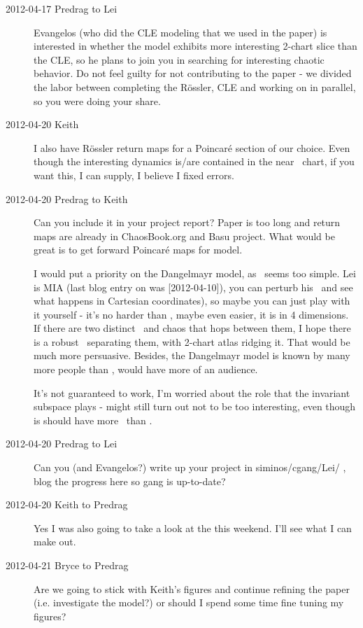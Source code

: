 \begin{description}
\item[2012-04-17 Predrag to Lei] Evangelos (who did the CLE modeling that
we used in the paper) is interested in whether the {\twoMode} model exhibits
more interesting 2-chart slice than the CLE, so he plans to join you in
searching for interesting chaotic behavior. Do not feel guilty for not
contributing to the paper - we divided the labor between completing the
R\"ossler, CLE and working on {\twoMode} in parallel, so you were doing your
share.


\item[2012-04-20 Keith] I also have R\"ossler return maps for a
Poincar\'e section of our choice.  Even though the interesting dynamics
is/are contained in the near \eqv\ chart, if you want this, I can
supply, I believe I fixed errors.

\item[2012-04-20 Predrag to Keith] Can you include it in your project report?
Paper is too long and return maps are already in ChaosBook.org and Basu project.
What would be great is to get forward Poincar\'e maps for {\twoMode} model.

I would put a priority on the Dangelmayr {\twoMode} model, as \cLe\ seems too
simple. Lei is MIA (last blog entry on {\twoMode} was [2012-04-10]), you can
perturb his \reqva\ and see what happens in Cartesian coordinates), so
maybe you can just play with it yourself - it's no harder than \cLe,
maybe even easier, it is in 4 dimensions. If there are two distinct
\reqva\ and chaos that hops between them, I hope there is a robust
\chartBord\ separating them, with 2-chart atlas ridging it. That would be
much more persuasive. Besides, the Dangelmayr {\twoMode} model is known by
many more people than \cLe, would have more of an audience.

It's not guaranteed to work, I'm worried about the role that the
invariant subspace plays - might still turn out not to be too
interesting, even though is should have more \reqva\ than \cLe.


\item[2012-04-20 Predrag to Lei] Can you (and Evangelos?) write up {\twoMode}
your project in siminos/cgang/Lei/ , blog the progress here so gang is
up-to-date?

\item[2012-04-20 Keith to Predrag]  Yes I was also going to take a look
at the {\twoMode} this weekend.  I'll see what I can make out.

\item[2012-04-21 Bryce to Predrag] Are we going to stick
with Keith's figures and continue refining the paper (i.e. investigate
the {\twoMode} model?) or should I spend some time fine tuning my figures?


\end{description}
